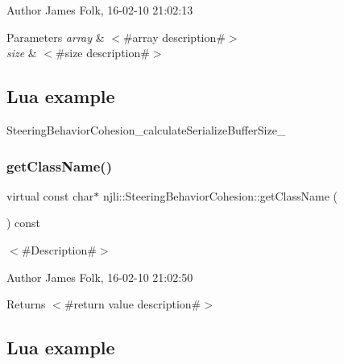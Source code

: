 \begin{DoxyAuthor}{Author}
James Folk, 16-\/02-\/10 21\+:02\+:13
\end{DoxyAuthor}

\begin{DoxyParams}{Parameters}
{\em array} & $<$\#array description\#$>$ \\
\hline
{\em size} & $<$\#size description\#$>$\\
\hline
\end{DoxyParams}
\hypertarget{classnjli_1_1_steering_behavior_wander_ex1}{}\subsection{Lua example}\label{classnjli_1_1_steering_behavior_wander_ex1}

\begin{DoxyCodeInclude}
\end{DoxyCodeInclude}
Steering\+Behavior\+Cohesion\+\_\+calculate\+Serialize\+Buffer\+Size\+\_\+ \mbox{\label{classnjli_1_1_steering_behavior_cohesion_a72557106c655320637724465e98b1ecd}} 
\subsubsection{\texorpdfstring{get\+Class\+Name()}{getClassName()}}
{\footnotesize\ttfamily virtual const char$\ast$ njli\+::\+Steering\+Behavior\+Cohesion\+::get\+Class\+Name (\begin{DoxyParamCaption}{ }\end{DoxyParamCaption}) const\hspace{0.3cm}{\ttfamily [virtual]}}



$<$\#\+Description\#$>$ 

\begin{DoxyAuthor}{Author}
James Folk, 16-\/02-\/10 21\+:02\+:50
\end{DoxyAuthor}
\begin{DoxyReturn}{Returns}
$<$\#return value description\#$>$
\end{DoxyReturn}
\hypertarget{classnjli_1_1_steering_behavior_wander_ex1}{}\subsection{Lua example}\label{classnjli_1_1_steering_behavior_wander_ex1}

